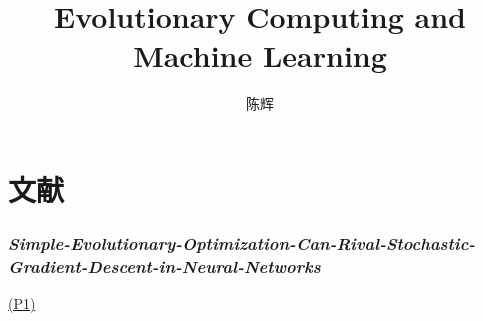 \documentclass{article}
\title{Evolutionary Computing and Machine Learning}
\author{陈辉}
\date{}
\newcommand{\paper}[2]{\hyperlink{./papers/#1.pdf.#2}{(P#2)}}
\begin{document}
\maketitle
\tableofcontents
\newpage
\part{文献}
\section{\textit{Simple-Evolutionary-Optimization-Can-Rival-Stochastic-Gradient-Descent-in-Neural-Networks}}
\paper{Simple-Evolutionary-Optimization-Can-Rival-Stochastic-Gradient-Descent-in-Neural-Networks}{1}






%
%
\end{document}
